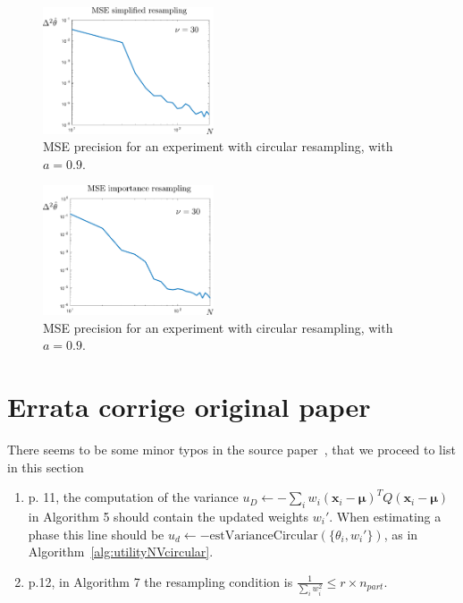 \documentclass[aps, pra, 10pt, twocolumn, superscriptaddress,floatfix]{revtex4-1}
\begin{document}
%
\begin{figure}[!t]
	\begin{center}
		\includegraphics[width=0.45\textwidth]{immagini/simplifiedResampling.pdf}
	\end{center}
	\caption{MSE precision for an experiment with circular resampling, with $a = 0.9$.}
	\label{fig:simplifiedResampling}
\end{figure}
%
\begin{figure}[!t]
	\begin{center}
		\includegraphics[width=0.45\textwidth]{immagini/importanceResampling.pdf}
	\end{center}
	\caption{MSE precision for an experiment with circular resampling, with $a = 0.9$.}
	\label{fig:importanceResampling}
\end{figure}
%

\section{Errata corrige original paper}
%
There seems to be some minor typos in the source paper~\cite{Granade2012}, that we proceed to list in this section
%
\begin{enumerate}
	
	\item p. 11, the computation of the variance $u_D \leftarrow - \sum_{i} w_i (\boldsymbol{x}_i - \boldsymbol{\mu})^T Q (\boldsymbol{x}_i - \boldsymbol{\mu})$ in Algorithm 5 should contain the updated weights $w_i'$. When estimating a phase this line should be $u_d \leftarrow - \text{estVarianceCircular} (\lbrace \theta_i, w_i' \rbrace)$, as in Algorithm~\ref{alg:utilityNVcircular}.
	
	\item p.12, in Algorithm 7 the resampling condition is $\frac{1}{\sum_{i} w_i^2} \le r \times n_{part}$.
	
\end{enumerate}
\end{document}
